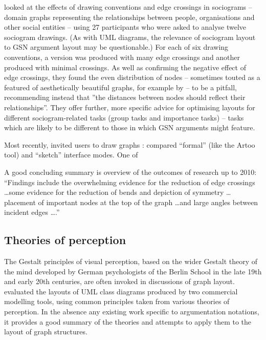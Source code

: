 \citet{huang2007effects} looked at the effects of drawing conventions and edge crossings in sociograms -- domain graphs representing the relationships between people, organisations and other social entities -- using 27 participants who were asked to analyse twelve sociogram drawings. (As with UML diagrams, the relevance of sociogram layout to GSN argument layout may be questionable.) For each of six drawing conventions, a version was produced with many edge crossings and another produced with minimal crossings. As well as confirming the negative effect of edge crossings, they found the even distribution of nodes -- sometimes touted as a featured of aesthetically beautiful graphs, for example by \citet{SPE:SPE4380211102} -- to be a pitfall, recommending instead that ''the distances between nodes should reflect their relationships''. They offer further, more specific advice for optimising layouts for different sociogram-related tasks (group tasks and importance tasks) -- tasks which are likely to be different to those in which GSN arguments might feature.

Most recently, \citet{5674033} invited users to draw graphs :
compared ``formal'' (like the Artoo tool) and ``sketch'' interface modes.
One of

A good concluding summary is \citet{CRPITV106P80-88} overview of the outcomes of research up to 2010: ``Findings include
the overwhelming evidence for the reduction of edge
crossings \ldots some evidence for the reduction of
bends and depiction of symmetry \ldots
placement of important nodes at the top of the graph
\ldots and large angles between incident
edges \ldots.''

\subsection{Theories of perception \label{sec:gestalt}}

The Gestalt principles of visual perception,
based on the wider Gestalt theory of the mind developed by German psychologists of the Berlin School in the late 19th and early 20th centuries,
are often \citep[pp.~136]{storrle} invoked in discussions of graph layout.
\citet{kennysun} evaluated the layouts of UML class diagrams produced by two commercial modelling tools, using common principles taken from various theories of perception.
In the absence any existing work specific to argumentation notations, it provides a good summary of the theories and attempts to apply them to the layout of graph structures.

